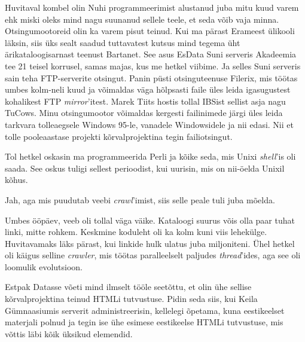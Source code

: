 Huvitaval kombel olin Nuhi programmeerimist alustanud juba mitu kuud 
varem ehk miski oleks mind nagu suunanud sellele teele, et seda võib vaja 
minna. Otsingumootoreid olin ka varem pisut teinud. Kui ma pärast 
Erameest ülikooli läksin, siis üks sealt saadud tuttavatest kutsus mind 
tegema üht ärikataloogisarnast teenust Bartanet. See 
asus EsData Suni serveris Akadeemia tee 21 
teisel korrusel, samas majas, kus me hetkel viibime. Ja selles Suni serveris 
sain teha FTP-serverite otsingut. Panin püsti otsinguteenuse Filerix, mis töötas umbes 
kolm-neli kuud ja võimaldas väga hõlpsasti 
faile üles leida igasugustest kohalikest FTP \emph{mirror}'itest. 
Marek Tiits hostis tollal IBSist 
sellist asja nagu TuCows. Minu otsingumootor 
võimaldas kergesti failinimede järgi üles leida tarkvara tolleaegsele Windows 
95-le, vanadele Windowsidele ja nii edasi. Nii et tolle pooleaastase projekti kõrvalprojektina tegin failiotsingut.


Tol hetkel oskasin ma programmeerida Perli ja kõike 
seda, mis Unixi \emph{shell}'is oli saada. See oskus tuligi sellest perioodist, 
kui uurisin, mis on nii-öelda Unixil kõhus.


Jah, aga mis puudutab veebi \emph{crawl}'imist, siis selle peale tuli juba 
mõelda.


Umbes ööpäev, veeb oli 
tollal väga väike. Kataloogi suurus võis olla paar tuhat linki, mitte rohkem. 
Keskmine koduleht oli ka kolm kuni viis lehekülge. Huvitavamaks läks pärast, kui linkide hulk ulatus juba 
miljoniteni. Ühel hetkel oli käigus selline \emph{crawler}, mis 
töötas paralleelselt paljudes \emph{thread}'ides, aga see oli 
loomulik evolutsioon. 

Estpak Datasse võeti mind ilmselt tööle seetõttu, et olin ühe sellise kõrvalprojektina 
teinud HTMLi tutvustuse. Pidin seda siis, kui Keila Gümnaasiumis
serverit administreerisin, kellelegi õpetama, kuna 
eestikeelset materjali polnud ja tegin ise ühe esimese eestikeelse 
HTMLi tutvustuse, mis võttis läbi kõik üksikud elemendid.

